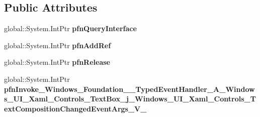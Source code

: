 \subsection*{Public Attributes}
\begin{DoxyCompactItemize}
\item 
\mbox{\label{struct_windows_1_1_foundation_1_1_typed_event_handler___a___windows___u_i___xaml___controls___te0b038d62b9928b8ea6f0314c4279430d_aae808d8b4d77df7c43b98afce0788c01}} 
global\+::\+System.\+Int\+Ptr {\bfseries pfn\+Query\+Interface}
\item 
\mbox{\label{struct_windows_1_1_foundation_1_1_typed_event_handler___a___windows___u_i___xaml___controls___te0b038d62b9928b8ea6f0314c4279430d_a5d638b8d2cf3a30cfa368269d3e58699}} 
global\+::\+System.\+Int\+Ptr {\bfseries pfn\+Add\+Ref}
\item 
\mbox{\label{struct_windows_1_1_foundation_1_1_typed_event_handler___a___windows___u_i___xaml___controls___te0b038d62b9928b8ea6f0314c4279430d_a53cea4e1d6a494b78085f8e9ae387a09}} 
global\+::\+System.\+Int\+Ptr {\bfseries pfn\+Release}
\item 
\mbox{\label{struct_windows_1_1_foundation_1_1_typed_event_handler___a___windows___u_i___xaml___controls___te0b038d62b9928b8ea6f0314c4279430d_aa3c2bd7284f14bed26a4f32f057c0b37}} 
global\+::\+System.\+Int\+Ptr {\bfseries pfn\+Invoke\+\_\+\+Windows\+\_\+\+Foundation\+\_\+\+\_\+\+Typed\+Event\+Handler\+\_\+\+A\+\_\+\+Windows\+\_\+\+U\+I\+\_\+\+Xaml\+\_\+\+Controls\+\_\+\+Text\+Box\+\_\+j\+\_\+\+Windows\+\_\+\+U\+I\+\_\+\+Xaml\+\_\+\+Controls\+\_\+\+Text\+Composition\+Changed\+Event\+Args\+\_\+\+V\+\_\+}
\end{DoxyCompactItemize}
